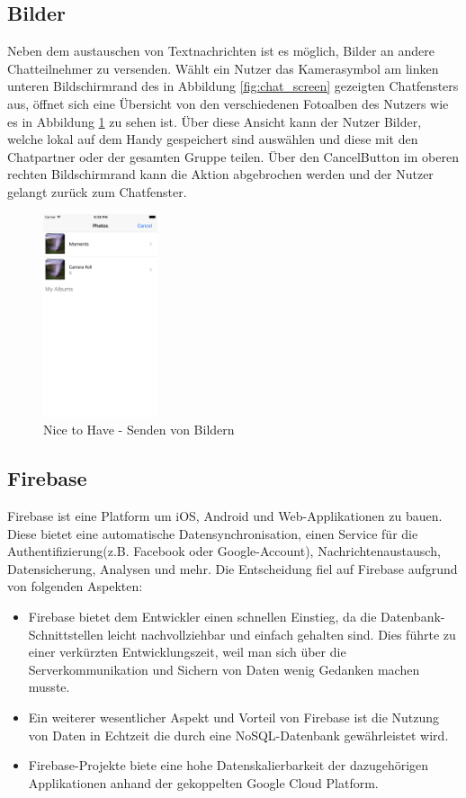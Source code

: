 \subsection{Bilder}
Neben dem austauschen von Textnachrichten ist es möglich, Bilder an andere Chatteilnehmer zu versenden. Wählt ein Nutzer das Kamerasymbol am linken unteren Bildschirmrand des in Abbildung \ref{fig:chat_screen} gezeigten Chatfensters aus, öffnet sich eine Übersicht von den verschiedenen Fotoalben des Nutzers wie es in Abbildung \ref{fig:sendphotos_screen} zu sehen ist. Über diese Ansicht kann der Nutzer Bilder, welche lokal auf dem Handy gespeichert sind auswählen und diese mit den Chatpartner oder der gesamten Gruppe teilen. Über den \glqq Cancel\grqq{-}Button im oberen rechten Bildschirmrand kann die Aktion abgebrochen werden und der Nutzer gelangt zurück zum Chatfenster.
\begin{figure}[ht]
  \centering
    \includegraphics[width=0.3\textwidth]{images/sendphotos_screen}
    \caption{Nice to Have - Senden von Bildern}
	 \label{fig:sendphotos_screen}
\end{figure}
\newpage

\subsection{Firebase}

Firebase ist eine Platform um iOS, Android und Web-Applikationen zu bauen. Diese bietet eine automatische Datensynchronisation, einen Service für die Authentifizierung(z.B. Facebook oder Google-Account), Nachrichtenaustausch, Datensicherung, Analysen und mehr.
Die Entscheidung fiel auf Firebase aufgrund von folgenden Aspekten: 

\begin{itemize} 
\item Firebase bietet dem Entwickler einen schnellen Einstieg, da die Datenbank-Schnittstellen leicht nachvollziehbar und einfach gehalten sind. Dies führte zu einer verkürzten Entwicklungszeit, weil man sich über die Serverkommunikation und Sichern von Daten wenig Gedanken machen musste.
\item Ein weiterer wesentlicher Aspekt und Vorteil von Firebase ist die Nutzung von Daten in Echtzeit die durch eine NoSQL-Datenbank gewährleistet wird.
\item Firebase-Projekte biete eine hohe Datenskalierbarkeit der dazugehörigen Applikationen anhand der gekoppelten Google Cloud Platform.
\end{itemize}


